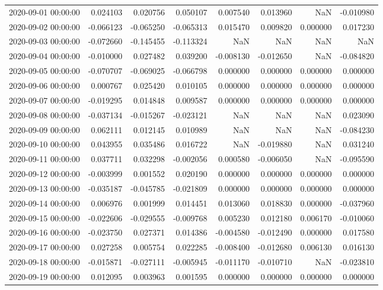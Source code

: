 \begin{tabular}{lrrrrrrr}
2020-09-01 00:00:00 & 0.024103 & 0.020756 & 0.050107 & 0.007540 & 0.013960 & NaN & -0.010980 \\
2020-09-02 00:00:00 & -0.066123 & -0.065250 & -0.065313 & 0.015470 & 0.009820 & 0.000000 & 0.017230 \\
2020-09-03 00:00:00 & -0.072660 & -0.145455 & -0.113324 & NaN & NaN & NaN & NaN \\
2020-09-04 00:00:00 & -0.010000 & 0.027482 & 0.039200 & -0.008130 & -0.012650 & NaN & -0.084820 \\
2020-09-05 00:00:00 & -0.070707 & -0.069025 & -0.066798 & 0.000000 & 0.000000 & 0.000000 & 0.000000 \\
2020-09-06 00:00:00 & 0.000767 & 0.025420 & 0.010105 & 0.000000 & 0.000000 & 0.000000 & 0.000000 \\
2020-09-07 00:00:00 & -0.019295 & 0.014848 & 0.009587 & 0.000000 & 0.000000 & 0.000000 & 0.000000 \\
2020-09-08 00:00:00 & -0.037134 & -0.015267 & -0.023121 & NaN & NaN & NaN & 0.023090 \\
2020-09-09 00:00:00 & 0.062111 & 0.012145 & 0.010989 & NaN & NaN & NaN & -0.084230 \\
2020-09-10 00:00:00 & 0.043955 & 0.035486 & 0.016722 & NaN & -0.019880 & NaN & 0.031240 \\
2020-09-11 00:00:00 & 0.037711 & 0.032298 & -0.002056 & 0.000580 & -0.006050 & NaN & -0.095590 \\
2020-09-12 00:00:00 & -0.003999 & 0.001552 & 0.020190 & 0.000000 & 0.000000 & 0.000000 & 0.000000 \\
2020-09-13 00:00:00 & -0.035187 & -0.045785 & -0.021809 & 0.000000 & 0.000000 & 0.000000 & 0.000000 \\
2020-09-14 00:00:00 & 0.006976 & 0.001999 & 0.014451 & 0.013060 & 0.018830 & 0.000000 & -0.037960 \\
2020-09-15 00:00:00 & -0.022606 & -0.029555 & -0.009768 & 0.005230 & 0.012180 & 0.006170 & -0.010060 \\
2020-09-16 00:00:00 & -0.023750 & 0.027371 & 0.014386 & -0.004580 & -0.012490 & 0.000000 & 0.017580 \\
2020-09-17 00:00:00 & 0.027258 & 0.005754 & 0.022285 & -0.008400 & -0.012680 & 0.006130 & 0.016130 \\
2020-09-18 00:00:00 & -0.015871 & -0.027111 & -0.005945 & -0.011170 & -0.010710 & NaN & -0.023810 \\
2020-09-19 00:00:00 & 0.012095 & 0.003963 & 0.001595 & 0.000000 & 0.000000 & 0.000000 & 0.000000 \\

\end{tabular}
